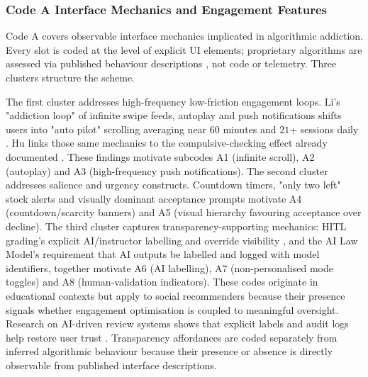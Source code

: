 \documentclass[11pt]{article}
\begin{document}
\subsubsection{Code A Interface Mechanics and Engagement Features}
\label{sec:codeA_interface_mechanics} Code A covers observable interface mechanics implicated in algorithmic addiction. Every slot is coded at the level of explicit UI elements; proprietary algorithms are assessed via published behaviour descriptions \parencites[6]{6295677}[2]{8958037}, not code or telemetry. Three clusters structure the scheme.

The first cluster addresses high-frequency low-friction engagement loops. Li's "addiction loop" of infinite swipe feeds, autoplay and push notifications shifts users into "auto pilot" scrolling averaging near $60$ minutes and $21$+ sessions daily \parencites[2]{8958037}[3]{8958037}. Hu links those same mechanics to the compulsive-checking effect already documented \parencites[2]{3303310}[20]{3303310}. These findings motivate subcodes A1 (infinite scroll), A2 (autoplay) and A3 (high-frequency push notifications). The second cluster addresses salience and urgency constructs. Countdown timers, "only two left" stock alerts and visually dominant acceptance prompts \parencites[136]{8745065}[7]{6295677} motivate A4 (countdown/scarcity banners) and A5 (visual hierarchy favouring acceptance over decline). The third cluster captures transparency-supporting mechanics: HITL grading's explicit AI/instructor labelling and override visibility \parencites[20]{6805789}[21]{6805789}, and the AI Law Model's requirement \parencites[59.1]{2977039} that AI outputs be labelled and logged with model identifiers, together motivate A6 (AI labelling), A7 (non-personalised mode toggles) and A8 (human-validation indicators). These codes originate in educational contexts but apply to social recommenders because their presence signals whether engagement optimisation is coupled to meaningful oversight. Research on AI-driven review systems shows that explicit labels and audit logs help restore user trust \parencites[4]{7235975}. Transparency affordances are coded separately from inferred algorithmic behaviour because their presence or absence is directly observable from published interface descriptions.
\end{document}
